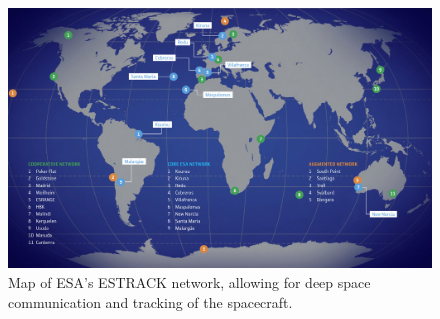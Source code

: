




    
    
\begin{figure}[htb]
	\centering
	\includegraphics[width=\textwidth]{figures/comms/ESTRACK-map}
	\caption{Map of ESA's ESTRACK network, allowing for deep space communication and tracking of the spacecraft.}
	\label{fig:ESTRACK-map}
\end{figure}